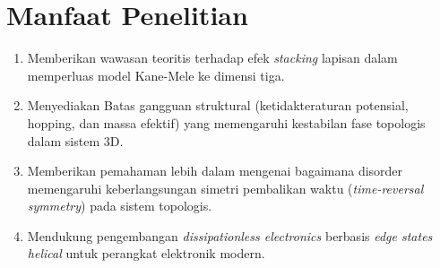 \section{Manfaat Penelitian}
\begin{enumerate} \item Memberikan wawasan teoritis terhadap efek \textit{stacking} lapisan dalam memperluas model Kane-Mele ke dimensi tiga. \item Menyediakan Batas gangguan struktural (ketidakteraturan potensial, hopping, dan massa efektif) yang memengaruhi kestabilan fase topologis dalam sistem 3D. \item Memberikan pemahaman lebih dalam mengenai bagaimana disorder memengaruhi keberlangsungan simetri pembalikan waktu (\textit{time-reversal symmetry}) pada sistem topologis. \item Mendukung pengembangan \textit{dissipationless electronics} berbasis \textit{edge states helical} untuk perangkat elektronik modern.\end{enumerate}
